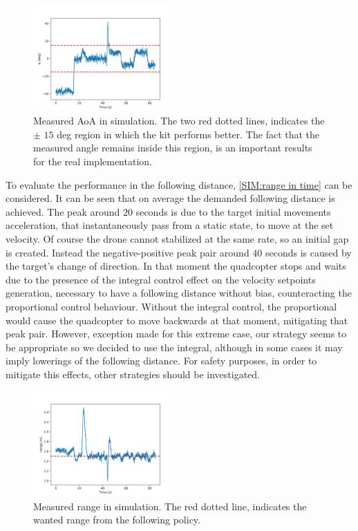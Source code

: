 \begin{figure}
    \centering
    \includegraphics[width=0.48\textwidth]{images/Simulation/AoA measures.png}
    \caption{Measured AoA in simulation. The two red dotted lines, indicates the $\pm$ $15$ deg region in which the kit performs better. The fact that the measured angle remains inside this region, is an important results for the real implementation.}
    \label{SIM:aoa in time}
\end{figure}

To evaluate the performance in the following distance, \autoref{SIM:range in time} can be considered. It can be seen that on average the demanded following distance is achieved. The peak around $20$ seconds is due to the target initial movements acceleration, that instantaneously pass from a static state, to move at the set velocity. Of course the drone cannot stabilized at the same rate, so an initial gap is created. Instead the negative-positive peak pair around $40$ seconds is caused by the target's change of direction. In that moment the quadcopter stops and waits due to the presence of the integral control effect on the velocity setpoints generation, necessary to have a following distance without bias, counteracting the proportional control behaviour. Without the integral control, the proportional would cause the quadcopter to move backwards at that moment, mitigating that peak pair. However, exception made for this extreme case, our strategy seems to be appropriate so we decided to use the integral, although in some cases it may imply lowerings of the following distance. For safety purposes, in order to mitigate this effects, other strategies should be investigated.\\

\begin{figure}
    \centering
    \includegraphics[width=0.48\textwidth]{images/Simulation/Range measures.png}
    \caption{Measured range in simulation. The red dotted line, indicates the wanted range from the following policy.}
    \label{SIM:range in time}
\end{figure}

